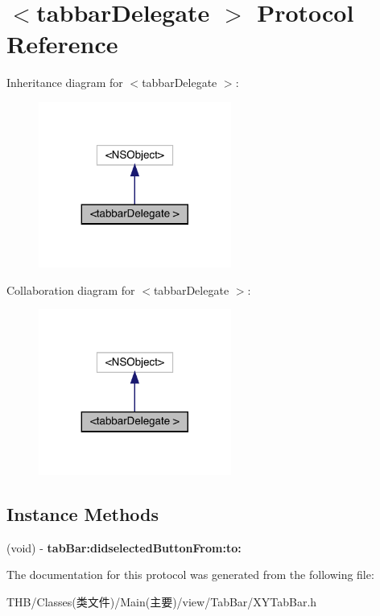 \hypertarget{protocoltabbar_delegate_01-p}{}\section{$<$tabbar\+Delegate $>$ Protocol Reference}
\label{protocoltabbar_delegate_01-p}


Inheritance diagram for $<$tabbar\+Delegate $>$\+:\nopagebreak
\begin{figure}[H]
\begin{center}
\leavevmode
\includegraphics[width=179pt]{protocoltabbar_delegate_01-p__inherit__graph}
\end{center}
\end{figure}


Collaboration diagram for $<$tabbar\+Delegate $>$\+:\nopagebreak
\begin{figure}[H]
\begin{center}
\leavevmode
\includegraphics[width=179pt]{protocoltabbar_delegate_01-p__coll__graph}
\end{center}
\end{figure}
\subsection*{Instance Methods}
\begin{DoxyCompactItemize}
\item 
\mbox{\label{protocoltabbar_delegate_01-p_a829055f2575b653f0451a268f3e8bcda}} 
(void) -\/ {\bfseries tab\+Bar\+:didselected\+Button\+From\+:to\+:}
\end{DoxyCompactItemize}


The documentation for this protocol was generated from the following file\+:\begin{DoxyCompactItemize}
\item 
T\+H\+B/\+Classes(类文件)/\+Main(主要)/view/\+Tab\+Bar/X\+Y\+Tab\+Bar.\+h\end{DoxyCompactItemize}
